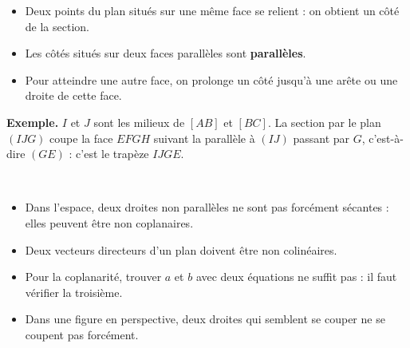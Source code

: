 \noindent
\begin{minipage}[c]{0.6\linewidth}
\begin{savoirfaire}
\raggedright
\begin{itemize}[leftmargin=1.2em,itemsep=0.4mm,topsep=0.3mm]
  \item Deux points du plan situés sur une même face se relient : on obtient un côté de la section.
  \item Les côtés situés sur deux faces parallèles sont \textbf{parallèles}.
  \item Pour atteindre une autre face, on prolonge un côté jusqu'à une arête ou une droite de cette face.
\end{itemize}
\textbf{Exemple.} $I$ et $J$ sont les milieux de $[AB]$ et $[BC]$. La section par le plan $(IJG)$ coupe la face $EFGH$ suivant la
parallèle à $(IJ)$ passant par $G$, c'est-à-dire $(GE)$ : c'est le trapèze $IJGE$.
\end{savoirfaire}
\end{minipage}\hfill
\begin{minipage}[c]{0.36\linewidth}
\centering
{}\\[0.5mm]
\end{minipage}

\begin{attention}
\begin{itemize}[label={\color{otOrange}\textbullet},leftmargin=1.4em,itemsep=0.6mm,topsep=0.5mm]
  \item Dans l'espace, deux droites non parallèles ne sont pas forcément sécantes : elles peuvent être non coplanaires.
  \item Deux vecteurs directeurs d'un plan doivent être non colinéaires.
  \item Pour la coplanarité, trouver $a$ et $b$ avec deux équations ne suffit pas : il faut vérifier la troisième.
  \item Dans une figure en perspective, deux droites qui semblent se couper ne se coupent pas forcément.
\end{itemize}
\end{attention}

